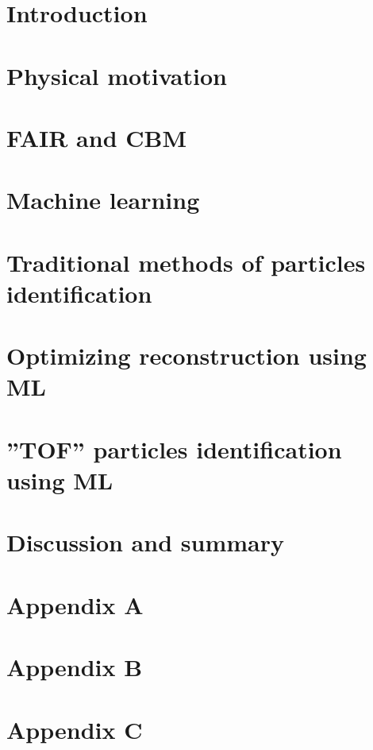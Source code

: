 \documentclass[12pt,a4paper,twoside]{book}
\numberwithin{equation}{chapter} %
\begin{document}


\tableofcontents
{}
\pagestyle{empty}

\chapter{Introduction}
\thispagestyle{fancy}


\chapter{Physical motivation}
\thispagestyle{fancy}

\chapter{FAIR and CBM}

\chapter{Machine learning}

\chapter{Traditional methods of particles identification}

\chapter{Optimizing \PKshort reconstruction using ML}

\chapter{''TOF'' particles identification using ML}

\chapter{Discussion and summary}

\chapter{Appendix A}

\chapter{Appendix B}

\chapter{Appendix C}




\listoffigures
\thispagestyle{fancy}

\listoftables
\thispagestyle{fancy}
\end{document}
